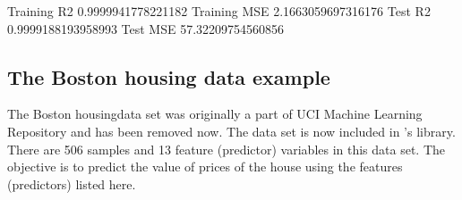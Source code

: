 \documentclass[letterpaper,10pt,english]{sphinxmanual}
\begin{document}
\begin{sphinxVerbatim}[commandchars=\\\{\}]
    
    
\end{sphinxVerbatim}

\begin{sphinxVerbatim}[commandchars=\\\{\}]
Training R2
0.9999941778221182
Training MSE
2.1663059697316176
Test R2
0.9999188193958993
Test MSE
57.32209754560856
\end{sphinxVerbatim}




\subsection{The Boston housing data example}
\label{\detokenize{chapter4:the-boston-housing-data-example}}
The Boston housingdata set was originally a part of UCI Machine Learning Repository
and has been removed now. The data set is now included in ’s
library.  There are 506 samples and 13 feature (predictor) variables
in this data set. The objective is to predict the value of prices of
the house using the features (predictors) listed here.
\end{document}
